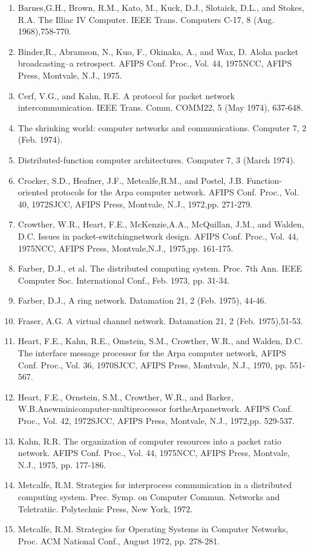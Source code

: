 \begin{enumerate}
	\item	Barnes,G.H., Brown, R.M., Kato, M., Kuck, D.J., Slotaick, D.L., and Stokes, R.A. The Illiac IV Computer. IEEE Trans. Computers C-17, 8 (Aug. 1968),758-770.
 	\item	Binder,R., Abramson, N., Kuo, F., Okinaka, A., and Wax, D. Aloha packet broadcasting--a retrospect. AFIPS Conf. Proc., Vol. 44, 1975NCC, AFIPS Press, Montvale, N.J., 1975.
	\item	Cerf, V.G., and Kahn, R.E. A protocol for packet network intercommunication. IEEE Trans. Comm. COMM22, 5 (May
1974), 637-648.
	\item	The shrinking world: computer networks and communications. Computer 7, 2 (Feb. 1974).
	\item	Distributed-function computer architectures. Computer 7, 3 (March 1974).
	\item	Crocker, S.D., Heafner, J.F., Metcalfe,R.M., and Postel,
J.B. Function-oriented protocols for the Arpa computer network. AFIPS Conf. Proc., Vol. 40, 1972SJCC, AFIPS Press, Montvale, N.J., 1972,pp. 271-279.
	\item	Crowther, W.R., Heart, F.E., McKenzie,A.A., McQuillan, J.M., and Walden, D.C. Issues in packet-switchingnetwork design. AFIPS Conf. Proc., Vol. 44, 1975NCC, AFIPS Press, Montvale,N.J., 1975,pp. 161-175.
	\item	Farber, D.J., et al. The distributed computing system. Proc. 7th Ann. IEEE Computer Soc. International Conf., Feb. 1973, pp. 31-34.
	\item	Farber, D.J., A ring network. Datamation 21, 2 (Feb. 1975), 44-46.
 	\item	Fraser, A.G. A virtual channel network. Datamation 21, 2 (Feb. 1975),51-53.
	\item	Heart, F.E., Kahn, R.E., Omstein, S.M., Crowther, W.R., and Walden, D.C. The interface message processor for the Arpa computer network, AFIPS Conf. Proc., Vol. 36, 1970SJCC, AFIPS Press, Montvale, N.J., 1970, pp. 551-567.
	\item	Heart, F.E., Ornstein, S.M., Crowther, W.R., and Barker, W.B.Anewminicomputer-multiprocessor fortheArpanetwork. AFIPS Conf. Proc., Vol. 42, 1972SJCC, AFIPS Press, Montvale, N.J., 1972,pp. 529-537.
	\item	Kahn, R.R. The organization of computer resources into a packet ratio network. AFIPS Conf. Proc., Vol. 44, 1975NCC, AFIPS Press, Montvale, N.J., 1975, pp. 177-186.
	\item	Metcalfe, R.M. Strategies for interprocess communication in a distributed computing system. Prec. Symp. on Computer Commun. Networks and Teletratiic. Polytechnic Press, New York, 1972.
	\item	Metcalfe, R.M. Strategies for Operating Systems in Computer Networks, Proc. ACM National Conf., August 1972, pp. 278-281. 
	

\end{enumerate}
